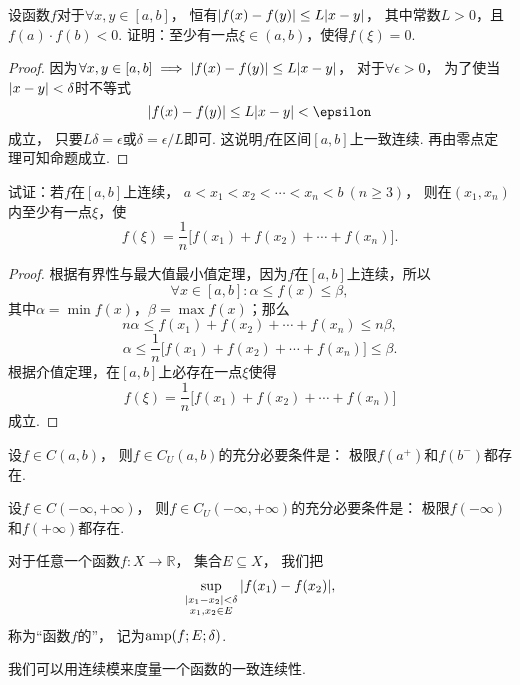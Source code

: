 \begin{example}
设函数\(f\)对于\(\forall x,y \in [a,b]\)，
恒有\(\abs{f(x) - f(y)} \leq L \abs{x - y}\)，
其中常数\(L > 0\)，且\(f(a) \cdot f(b) < 0\).
证明：至少有一点\(\xi \in (a,b)\)，使得\(f(\xi) = 0\).
\begin{proof}
因为\(\forall x,y \in [a,b] \implies \abs{f(x) - f(y)} \leq L \abs{x - y}\)，
对于\(\forall \epsilon > 0\)，
为了使当\(\abs{x - y} < \delta\)时不等式\[
\abs{f(x) - f(y)} \leq L \abs{x - y} < \epsilon
\]成立，
只要\(L \delta = \epsilon\)或\(\delta = \epsilon / L\)即可.
这说明\(f\)在区间\([a,b]\)上一致连续.
再由零点定理可知命题成立.
\end{proof}
\end{example}

\begin{example}
试证：若\(f\)在\([a,b]\)上连续，
\(a < x_1 < x_2 < \dotsb < x_n < b \ (n \geq 3)\)，
则在\((x_1,x_n)\)内至少有一点\(\xi\)，使\[
f(\xi) = \frac{1}{n} \bigl[
	f(x_1) + f(x_2) + \dotsb + f(x_n)
\bigr].
\]
\begin{proof}
根据有界性与最大值最小值定理，因为\(f\)在\([a,b]\)上连续，所以\[
\forall x \in [a,b] :
	\alpha \leq f(x) \leq \beta,
\]其中\(\alpha = \min f(x)\)，\(\beta = \max f(x)\)；那么\[
n \alpha \leq f(x_1) + f(x_2) + \dotsb + f(x_n) \leq n \beta,
\]\[
\alpha \leq \frac{1}{n} \bigl[f(x_1) + f(x_2) + \dotsb + f(x_n)\bigr] \leq \beta.
\]根据介值定理，在\([a,b]\)上必存在一点\(\xi\)使得\[
f(\xi) = \frac{1}{n} \bigl[ f(x_1) + f(x_2) + \dotsb + f(x_n) \bigr]
\]成立.
\end{proof}
\end{example}

\begin{theorem}\label{theorem:极限.闭区间上连续函数的性质.开区间上的连续函数一致连续的充分必要条件1}
设\(f \in C(a,b)\)，
则\(f \in C_U(a,b)\)的充分必要条件是：
极限\(f(a^+)\)和\(f(b^-)\)都存在.
\end{theorem}

\begin{theorem}\label{theorem:极限.闭区间上连续函数的性质.开区间上的连续函数一致连续的充分必要条件2}
设\(f \in C(-\infty,+\infty)\)，
则\(f \in C_U(-\infty,+\infty)\)的充分必要条件是：
极限\(f(-\infty)\)和\(f(+\infty)\)都存在.
\end{theorem}

\begin{definition}
对于任意一个函数\(f\colon X\to\mathbb{R}\)，
集合\(E \subseteq X\)，
我们把\[
	\sup_{\substack{
		\abs{x_1-x_2}<\delta \\
		x_1,x_2 \in E
	}}\abs{f(x_1)-f(x_2)},
\]
称为“函数\(f\)的”，
记为\(\operatorname{amp}(f;E;\delta)\).
\end{definition}

我们可以用连续模来度量一个函数的一致连续性.
